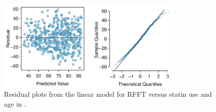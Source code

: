 \begin{figure}[h!]
	\centering
	\includegraphics[width=0.8\textwidth]
	{ch_multiple_linear_regression_oi_biostat/figures/prevendStatinAgeResidNormPlot/prevendStatinAgeResidNormPlot.pdf}
	\caption{Residual plots from the linear model for RFFT versus statin use and age in .}
	\label{prevendStatinAgeResidNormPlot}
\end{figure}

